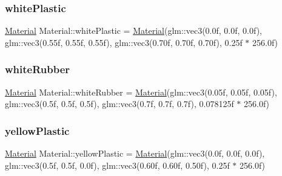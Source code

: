\mbox{\label{struct_material_ac7c32558480485c95f64558f7732f325}} 
\subsubsection{\texorpdfstring{whitePlastic}{whitePlastic}}
{\footnotesize\ttfamily \mbox{\hyperlink{struct_material}{Material}} Material\+::white\+Plastic = \mbox{\hyperlink{struct_material}{Material}}(glm\+::vec3(0.\+0f, 0.\+0f, 0.\+0f), glm\+::vec3(0.\+55f, 0.\+55f, 0.\+55f), glm\+::vec3(0.\+70f, 0.\+70f, 0.\+70f), 0.\+25f $\ast$ 256.\+0f)\hspace{0.3cm}{\ttfamily [static]}}

\mbox{\label{struct_material_ab84b745e205896377d3f1fc0e3d1246f}} 
\subsubsection{\texorpdfstring{whiteRubber}{whiteRubber}}
{\footnotesize\ttfamily \mbox{\hyperlink{struct_material}{Material}} Material\+::white\+Rubber = \mbox{\hyperlink{struct_material}{Material}}(glm\+::vec3(0.\+05f, 0.\+05f, 0.\+05f), glm\+::vec3(0.\+5f, 0.\+5f, 0.\+5f), glm\+::vec3(0.\+7f, 0.\+7f, 0.\+7f), 0.\+078125f $\ast$ 256.\+0f)\hspace{0.3cm}{\ttfamily [static]}}

\mbox{\label{struct_material_a9312d192d0bee2cbcf1e2d1d6f2d9a9e}} 
\subsubsection{\texorpdfstring{yellowPlastic}{yellowPlastic}}
{\footnotesize\ttfamily \mbox{\hyperlink{struct_material}{Material}} Material\+::yellow\+Plastic = \mbox{\hyperlink{struct_material}{Material}}(glm\+::vec3(0.\+0f, 0.\+0f, 0.\+0f), glm\+::vec3(0.\+5f, 0.\+5f, 0.\+0f), glm\+::vec3(0.\+60f, 0.\+60f, 0.\+50f), 0.\+25f $\ast$ 256.\+0f)\hspace{0.3cm}{\ttfamily [static]}}

\mbox{\label{struct_material_acc88ba21b8ed41d61c93d7128b7476fc}} 
